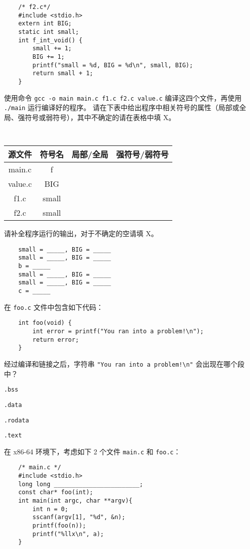 \begin{problems}
\begin{verbatim}
    /* f2.c*/
    #include <stdio.h>
    extern int BIG;
    static int small;
    int f_int_void() {
        small += 1;
        BIG += 1;
        printf("small = %d, BIG = %d\n", small, BIG);
        return small + 1;
    }
        \end{verbatim}
        使用命令 \verb|gcc -o main main.c f1.c f2.c value.c| 编译这四个文件，再使用 \verb|./main| 运行编译好的程序。
        \qn 请在下表中给出程序中相关符号的属性（局部或全局、强符号或弱符号），其中不确定的请在表格中填 X。
        \begin{table}[H]
            \tt
            \centering
            \begin{tabular}{|c|c|c|c|}
                \hline
                源文件 & 符号名 & {\qquad \qquad 局部/全局 \qquad \qquad} & {\qquad \qquad 强符号/弱符号 \qquad \qquad} \\ \hline
                main.c & f &  &  \\ \hline
                value.c & BIG &  &  \\ \hline
                f1.c & small &  &  \\ \hline
                f2.c & small &  &  \\ \hline
            \end{tabular}
        \end{table}
        \qn 请补全程序运行的输出，对于不确定的空请填 X。
        \begin{verbatim}
    small = _____, BIG = _____
    small = _____, BIG = _____
    b = _____
    small = _____, BIG = _____
    small = _____, BIG = _____
    c = _____
        \end{verbatim}
         在 \verb|foo.c| 文件中包含如下代码：
        \begin{verbatim}
    int foo(void) {
        int error = printf("You ran into a problem!\n");
        return error;
    }
        \end{verbatim}
        经过编译和链接之后，字符串 \verb|"You ran into a problem!\n"| 会出现在哪个段中？
        \begin{choices}
            \item \verb|.bss|
            \item \verb|.data|
            \item \verb|.rodata|
            \item \verb|.text|
        \end{choices}
         在 x86-64 环境下，考虑如下 2 个文件 \verb|main.c| 和 \verb|foo.c|：
        \begin{verbatim}
    /* main.c */
    #include <stdio.h>
    long long ________________________;
    const char* foo(int);
    int main(int argc, char **argv){
        int n = 0;
        sscanf(argv[1], "%d", &n);
        printf(foo(n));
        printf("%llx\n", a);
    }


\end{verbatim}
\end{problems}

